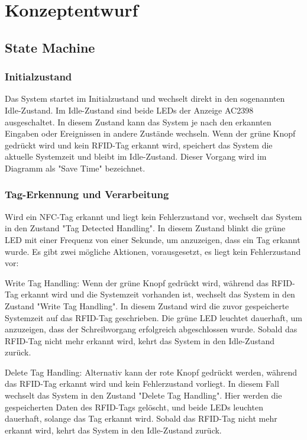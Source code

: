 \chapter*{Konzeptentwurf}
\label{cha:Konzeptentwurf}

\section*{State Machine}
\label{sec:State Machine}

\subsection*{Initialzustand}
\label{subsec:Initialzustand}

Das System startet im Initialzustand und wechselt direkt in den sogenannten Idle-Zustand. Im Idle-Zustand sind beide LEDs der Anzeige AC2398 ausgeschaltet. In diesem Zustand kann das System je nach den erkannten Eingaben oder Ereignissen in andere Zustände wechseln. Wenn der grüne Knopf gedrückt wird und kein RFID-Tag erkannt wird, speichert das System die aktuelle Systemzeit und bleibt im Idle-Zustand. Dieser Vorgang wird im Diagramm als "Save Time" bezeichnet.

\subsection*{Tag-Erkennung und Verarbeitung}
\label{subsec:Tag-ErkennungundVerarbeitung}

Wird ein NFC-Tag erkannt und liegt kein Fehlerzustand vor, wechselt das System in den Zustand "Tag Detected Handling". In diesem Zustand blinkt die grüne LED mit einer Frequenz von einer Sekunde, um anzuzeigen, dass ein Tag erkannt wurde. Es gibt zwei mögliche Aktionen, vorausgesetzt, es liegt kein Fehlerzustand vor:

Write Tag Handling: Wenn der grüne Knopf gedrückt wird, während das RFID-Tag erkannt wird und die Systemzeit vorhanden ist, wechselt das System in den Zustand "Write Tag Handling". In diesem Zustand wird die zuvor gespeicherte Systemzeit auf das RFID-Tag geschrieben. Die grüne LED leuchtet dauerhaft, um anzuzeigen, dass der Schreibvorgang erfolgreich abgeschlossen wurde. Sobald das RFID-Tag nicht mehr erkannt wird, kehrt das System in den Idle-Zustand zurück.

Delete Tag Handling: Alternativ kann der rote Knopf gedrückt werden, während das RFID-Tag erkannt wird und kein Fehlerzustand vorliegt. In diesem Fall wechselt das System in den Zustand "Delete Tag Handling". Hier werden die gespeicherten Daten des RFID-Tags gelöscht, und beide LEDs leuchten dauerhaft, solange das Tag erkannt wird. Sobald das RFID-Tag nicht mehr erkannt wird, kehrt das System in den Idle-Zustand zurück.

